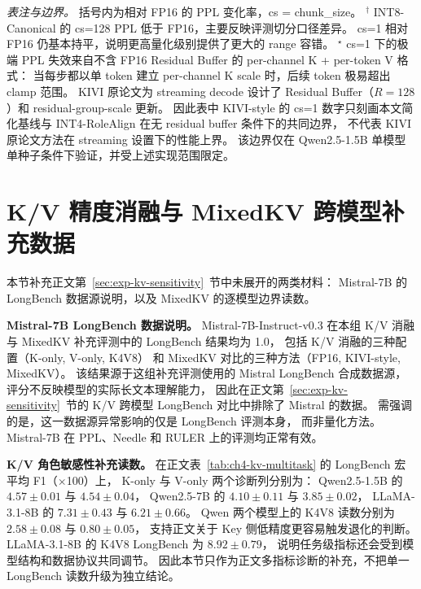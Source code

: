 \noindent\emph{表注与边界。}
括号内为相对 FP16 的 PPL 变化率，cs = chunk\_size。
$^{\dagger}$ INT8-Canonical 的 cs=128 PPL 低于 FP16，主要反映评测切分口径差异。
cs=1 相对 FP16 仍基本持平，说明更高量化级别提供了更大的 range 容错。
$^{\star}$ cs=1 下的极端 PPL 失效来自不含 FP16 Residual Buffer 的 per-channel K + per-token V 格式：
当每步都以单 token 建立 per-channel K scale 时，后续 token 极易超出 clamp 范围。
KIVI 原论文为 streaming decode 设计了 Residual Buffer（$R=128$）和 residual-group-scale 更新。
因此表中 KIVI-style 的 cs=1 数字只刻画本文简化基线与 INT4-RoleAlign 在无 residual buffer 条件下的共同边界，
不代表 KIVI 原论文方法在 streaming 设置下的性能上界。
该边界仅在 Qwen2.5-1.5B 单模型单种子条件下验证，并受上述实现范围限定。

\section{K/V 精度消融与 MixedKV 跨模型补充数据}
\label{sec:app-kv-ablation-full}

本节补充正文第~\ref{sec:exp-kv-sensitivity}~节中未展开的两类材料：
Mistral-7B 的 LongBench 数据源说明，以及 MixedKV 的逐模型边界读数。

\textbf{Mistral-7B LongBench 数据说明。}
Mistral-7B-Instruct-v0.3 在本组 K/V 消融与 MixedKV 补充评测中的 LongBench 结果均为 1.0，
包括 K/V 消融的三种配置（K-only, V-only, K4V8）
和 MixedKV 对比的三种方法（FP16, KIVI-style, MixedKV）。
该结果源于这组补充评测使用的 Mistral LongBench 合成数据源，
评分不反映模型的实际长文本理解能力，
因此在正文第~\ref{sec:exp-kv-sensitivity}~节的 K/V 跨模型 LongBench 对比中排除了 Mistral 的数据。
需强调的是，这一数据源异常影响的仅是 LongBench 评测本身，
而非量化方法。Mistral-7B 在 PPL、Needle 和 RULER 上的评测均正常有效。

\textbf{K/V 角色敏感性补充读数。}
在正文表~\ref{tab:ch4-kv-multitask} 的 LongBench 宏平均 F1（$\times$100）上，
K-only 与 V-only 两个诊断列分别为：
Qwen2.5-1.5B 的 $4.57 \pm 0.01$ 与 $4.54 \pm 0.04$，
Qwen2.5-7B 的 $4.10 \pm 0.11$ 与 $3.85 \pm 0.02$，
LLaMA-3.1-8B 的 $7.31 \pm 0.43$ 与 $6.21 \pm 0.66$。
Qwen 两个模型上的 K4V8 读数分别为 $2.58 \pm 0.08$ 与 $0.80 \pm 0.05$，
支持正文关于 Key 侧低精度更容易触发退化的判断。
LLaMA-3.1-8B 的 K4V8 LongBench 为 $8.92 \pm 0.79$，
说明任务级指标还会受到模型结构和数据协议共同调节。
因此本节只作为正文多指标诊断的补充，不把单一 LongBench 读数升级为独立结论。

